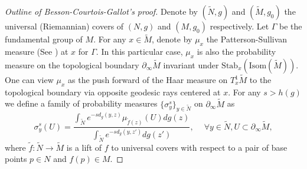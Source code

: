 \documentclass{article}
\newcommand{\del}{\partial}
\theoremstyle{definition}
\begin{document}
\begin{proof}[Outline of Besson-Courtois-Gallot's proof]\fi
Denote by $(\widetilde N,g)$ and $(\widetilde M,g_0)$ the universal (Riemannian) covers of $(N,g)$ and $(M,g_0)$ respectively. Let $\Gamma$ be the fundamental group of $M$. For any $x\in \widetilde M$, denote by $\mu_x$ the Patterson-Sullivan measure (See \cite{Al}) at $x$ for $\Gamma$. In this particular case, $\mu_x$ is also the probability measure on the topological boundary $\del_\infty \widetilde M$ invariant under $\mathrm{Stab}_x(\mathrm{Isom}(\widetilde M))$. One can view $\mu_x$ as the push forward of the Haar measure on $T^1_x\widetilde M$ to the topological boundary via opposite geodesic rays centered at $x$. For any $s>h(g)$ we define a family of probability measures $\{\sigma_y^s\}_{y\in\widetilde N}$ on $\del_\infty \widetilde M$ as
$$\sigma_y^s(U)=\frac{\int_{\widetilde N}e^{-sd_g(y,z)}\mu_{\widetilde f(z)}(U)dg(z)}{\int_{\widetilde N}e^{-sd_g(y,z')}dg(z')},\quad~\forall y\in\widetilde N, U\subset\del_\infty \widetilde M,$$
where $\widetilde f:\widetilde N\to\widetilde M$ is a lift of $f$ to universal covers with respect to a pair of base points $p\in N$ and $f(p)\in M$.


\end{proof}
\end{document}
